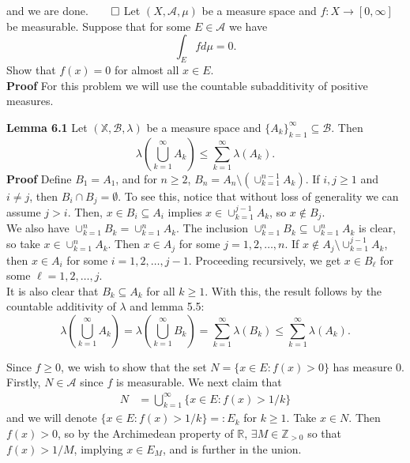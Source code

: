 \documentclass[11pt, letterpaper]{article}
\newcommand{\mbb}[1]{\mathbb{#1}}
\newcommand{\mc}[1]{\mathcal{#1}}
\begin{document}
    and we are done.\hfill{$\qed$}\newpage
     Let $(X,\mc{A},\mu)$ be a measure space and $f:X\rightarrow[0,\infty]$ be measurable. Suppose that for some $E\in\mc{A}$ we have
    \[\int_Efd\mu=0.\]
    Show that $f(x)=0$ for almost all $x\in E$.\\[10pt]
    {\bf Proof} For this problem we will use the countable subadditivity of positive measures.
    \begin{center}
        \begin{minipage}[c]{0.85\linewidth}
            {\bf Lemma 6.1} Let $(\mbb{X},\mc{B},\lambda)$ be a measure space and $\{A_k\}_{k=1}^\infty\subseteq\mc{B}$. Then
            \[\lambda\left(\bigcup_{k=1}^\infty A_k\right)\leq\sum_{k=1}^\infty\lambda(A_k).\]
            {\bf Proof} Define $B_1=A_1$, and for $n\geq 2$, $B_n=A_n\setminus(\cup_{k=1}^{n-1}A_k)$. If $i,j\geq 1$ and $i\neq j$, then $B_i\cap B_j=\emptyset$. To see this,
            notice that without loss of generality we can assume $j>i$. Then, $x\in B_i\subseteq A_i$ implies $x\in\cup_{k=1}^{j-1}A_k$, so $x\notin B_j$.\\[10pt]
            We also have $\cup_{k=1}^nB_k=\cup_{k=1}^nA_k$.
            The inclusion $\cup_{k=1}^nB_k\subseteq\cup_{k=1}^nA_k$ is clear, so take $x\in\cup_{k=1}^nA_k$. Then $x\in A_j$ for some $j=1,2,\dots,n$. If $x\notin A_j\setminus\cup_{k=1}^{j-1}A_k$, then $x\in A_i$ for some $i=1,2,\dots,j-1$. Proceeding recursively,
            we get $x\in B_\ell$ for some $\ell=1,2,\dots, j$.\\[10pt]
            It is also clear that $B_k\subseteq A_k$ for all $k\geq 1$. With this, the result follows by the countable additivity of $\lambda$ and lemma 5.5:
            \[\lambda\left(\bigcup_{k=1}^\infty A_k\right)=\lambda\left(\bigcup_{k=1}^\infty B_k\right)=\sum_{k=1}^\infty\lambda(B_k)\leq\sum_{k=1}^\infty\lambda(A_k).\tag*{$\qed$}\] 
        \end{minipage}
    \end{center}\vspace{10pt}
    Since $f\geq 0$, we wish to show that the set $N=\{x\in E:f(x)>0\}$ has measure $0$. Firstly, $N\in\mc{A}$ since $f$ is measurable. We next claim that
    \begin{align*}
        N&=\bigcup_{k=1}^\infty\{x\in E:f(x)>1/k\}\tag{5}
    \end{align*}
    and we will denote $\{x\in E:f(x)>1/k\}=:E_k$ for $k\geq 1$. Take $x\in N$. Then $f(x)>0$, so by the Archimedean property of $\mbb{R}$, $\exists M\in\mbb{Z}_{>0}$ so that $f(x)>1/M$, implying $x\in E_M$, and is further in the union.
\end{document}
